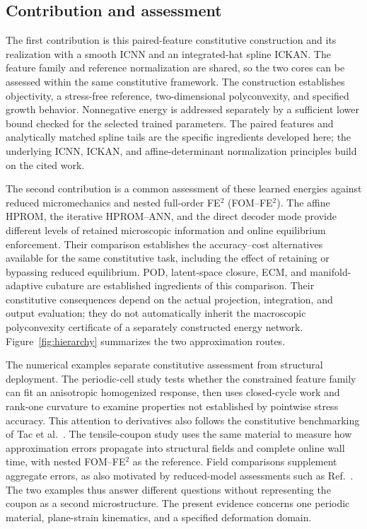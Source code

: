 \subsection{Contribution and assessment}
The first contribution is this paired-feature constitutive construction and its realization with a smooth ICNN and an integrated-hat spline ICKAN. The feature family and reference normalization are shared, so the two cores can be assessed within the same constitutive framework. The construction establishes objectivity, a stress-free reference, two-dimensional polyconvexity, and specified growth behavior. Nonnegative energy is addressed separately by a sufficient lower bound checked for the selected trained parameters. The paired features and analytically matched spline tails are the specific ingredients developed here; the underlying ICNN, ICKAN, and affine-determinant normalization principles build on the cited work.

The second contribution is a common assessment of these learned energies against reduced micromechanics and nested full-order FE$^2$ (FOM--FE$^2$). The affine HPROM, the iterative HPROM--ANN, and the direct decoder mode provide different levels of retained microscopic information and online equilibrium enforcement. Their comparison establishes the accuracy--cost alternatives available for the same constitutive task, including the effect of retaining or bypassing reduced equilibrium. POD, latent-space closure, ECM, and manifold-adaptive cubature are established ingredients of this comparison. Their constitutive consequences depend on the actual projection, integration, and output evaluation; they do not automatically inherit the macroscopic polyconvexity certificate of a separately constructed energy network. Figure~\ref{fig:hierarchy} summarizes the two approximation routes.

The numerical examples separate constitutive assessment from structural deployment. The periodic-cell study tests whether the constrained feature family can fit an anisotropic homogenized response, then uses closed-cycle work and rank-one curvature to examine properties not established by pointwise stress accuracy. This attention to derivatives also follows the constitutive benchmarking of Tac et al.~\cite{Tac2024}. The tensile-coupon study uses the same material to measure how approximation errors propagate into structural fields and complete online wall time, with nested FOM--FE$^2$ as the reference. Field comparisons supplement aggregate errors, as also motivated by reduced-model assessments such as Ref.~\cite{Chmiel2024}. The two examples thus answer different questions without representing the coupon as a second microstructure. The present evidence concerns one periodic material, plane-strain kinematics, and a specified deformation domain.


